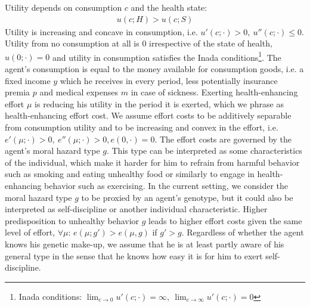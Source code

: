 Utility depends on consumption $c$ and the health state:
\begin{align*}
	u(c;H)>u(c;S)
\end{align*}
Utility is increasing and concave in consumption, i.e. $u'(c;\cdot)>0,\ u''(c;\cdot)\leq0$.
Utility from no consumption at all is $0$ irrespective of the state of health, $u(0;\cdot)=0$ and utility in consumption satisfies the Inada conditions\footnote{Inada conditions: $\lim_{c\rightarrow 0}u'(c;\cdot)=\infty,\ \lim_{c\rightarrow \infty}u'(c;\cdot)=0$}.
The agent's consumption is equal to the money available for consumption goods, i.e. a fixed income $y$ which he receives in every period, less potentially insurance premia $p$ and medical expenses $m$ in case of sickness.
Exerting health-enhancing effort $\mu$ is reducing his utility in the period it is exerted, which we  phrase as health-enhancing effort cost.
We assume effort costs to be additively separable from consumption utility and to be increasing and convex in the effort, i.e. $e'(\mu;\cdot)>0,\ e''(\mu;\cdot)>0, e(0,\cdot)=0$.
The effort costs are governed by the agent's moral hazard type $g$.
This type can be interpreted as some characteristics of the individual, which make it harder for him to refrain from harmful behavior such as smoking and eating unhealthy food or similarly to engage in health-enhancing behavior such as exercising.
In the current setting, we consider the moral hazard type $g$ to be proxied by an agent's genotype, but it could also be interpreted as self-discipline or another individual characteristic.
Higher predisposition to unhealthy behavior $g$ leads to higher effort costs given the same level of effort, $\forall\mu$:  $e(\mu;g')>e(\mu,g)$ if $g'>g$.
Regardless of whether the agent knows his genetic make-up, we assume that he is at least partly aware of his general type in the sense that he knows how easy it is for him to exert self-discipline.

